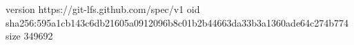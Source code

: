 version https://git-lfs.github.com/spec/v1
oid sha256:595a1cb143c6db21605a0912096b8c01b2b44663da33b3a1360ade64c274b774
size 349692
